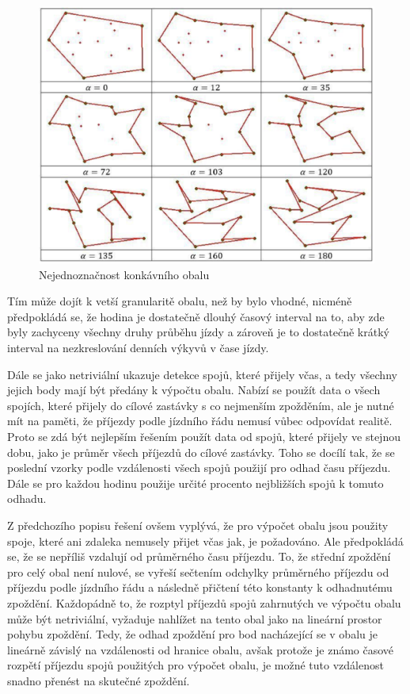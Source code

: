 \begin{figure}
\centering
  \includegraphics[width=0.8\linewidth]{../img/konkavni_obal_nejednoznacny.png}
  \caption{Nejednoznačnost konkávního obalu}
  \label{fig:konkavni_obal_nejednoznacny}
\end{figure}


\bigbreak


 Tím může dojít k vetší granularitě obalu, než by bylo vhodné, nicméně předpokládá se, že hodina je dostatečně dlouhý časový interval na to, aby zde byly zachyceny všechny druhy průběhu jízdy a zároveň je to dostatečně krátký interval na nezkreslování denních výkyvů v čase jízdy.


 \bigbreak


Dále se jako netriviální ukazuje detekce spojů, které přijely včas, a tedy všechny jejich body mají být předány k výpočtu obalu. Nabízí se použít data o všech spojích, které přijely do cílové zastávky s co nejmenším zpožděním, ale je nutné mít na paměti, že příjezdy podle jízdního řádu nemusí vůbec odpovídat realitě. Proto se zdá být nejlepším řešením použít data od spojů, které přijely ve stejnou dobu, jako je průměr všech příjezdů do cílové zastávky. Toho se docílí tak, že se poslední vzorky podle vzdálenosti všech spojů použijí pro odhad času příjezdu. Dále se pro každou hodinu použije určité procento nejbližších spojů k tomuto odhadu.


\bigbreak


Z předchozího popisu řešení ovšem vyplývá, že pro výpočet obalu jsou použity spoje, které ani zdaleka nemusely přijet včas jak, je požadováno. Ale předpokládá se, že se nepříliš vzdalují od průměrného času příjezdu. To, že střední zpoždění pro celý obal není nulové, se vyřeší sečtením odchylky průměrného příjezdu od příjezdu podle jízdního řádu a následně přičtení této konstanty k odhadnutému zpoždění. Každopádně to, že rozptyl příjezdů spojů zahrnutých ve výpočtu obalu může být netriviální, vyžaduje nahlížet na tento obal jako na lineární prostor pohybu zpoždění. Tedy, že odhad zpoždění pro bod nacházející se v obalu je lineárně závislý na vzdálenosti od hranice obalu, avšak protože je známo časové rozpětí příjezdu spojů použitých pro výpočet obalu, je možné tuto vzdálenost snadno přenést na skutečné zpoždění.


